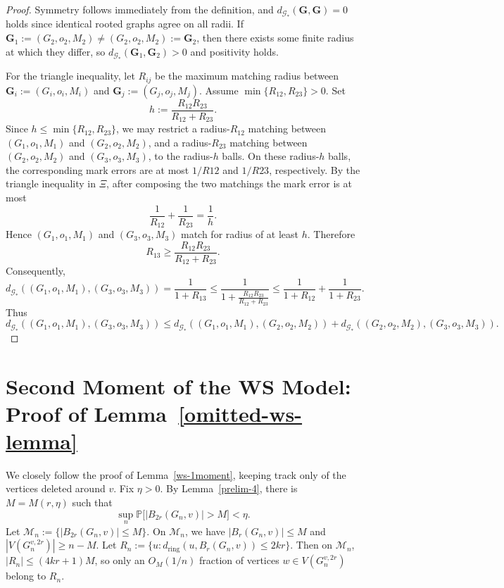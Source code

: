 \documentclass[10pt]{amsart}
\begin{document}
\begin{proof}
Symmetry follows immediately from the definition, and
$d_{\mathscr G_*}(\mathbf G, \mathbf G)=0$ holds since identical rooted graphs agree on all radii.
If $\mathbf G_1 := (G_2,o_2,M_2) \neq (G_2,o_2,M_2) := \mathbf G_2$, then there exists some finite radius at
which they differ, so $d_{\mathscr G_*}(\mathbf G_1, \mathbf G_2) >0$ and positivity holds.

For the triangle inequality, let $R_{ij}$ be the maximum matching radius between
$\mathbf G_i := (G_i,o_i,M_i)$ and $\mathbf G_j := (G_j,o_j,M_j)$. Assume $\min\{R_{12}, R_{23}\} > 0$. Set
\[
h:=\frac{R_{12} R_{23}}{R_{12}+R_{23}}.
\]
Since $h\le \min\{R_{12}, R_{23}\}$, we may restrict a radius-$R_{12}$ matching between
$(G_1,o_1,M_1)$ and $(G_2,o_2,M_2)$, and a radius-$R_{23}$ matching
between $(G_2,o_2,M_2)$ and $(G_3,o_3,M_3)$, to the radius-$h$ balls.
On these radius-$h$ balls, the corresponding mark errors are at most $1/R12$ and $1/R23$, respectively. By the triangle inequality in $\Xi$, after composing
the two matchings the mark error is at most
\[
\frac{1}{R_{12}}+\frac{1}{R_{23}}=\frac{1}{h}.
\]
Hence $(G_1,o_1,M_1)$ and $(G_3,o_3,M_3)$ match for radius of at least $h$.
Therefore
\[
R_{13}\ge \frac{R_{12}R_{23}}{R_{12}+R_{23}}.
\]
Consequently,
\[
d_{\mathscr G_*}((G_1,o_1,M_1),(G_3,o_3,M_3))
= \frac{1}{1+R_{13}}
\le \frac{1}{1+\frac{R_{12}R_{23}}{R_{12}+R_{23}}}
\le \frac{1}{1+R_{12}}+\frac{1}{1+R_{23}}.
\]
Thus
\[
d_{\mathscr G_*}((G_1,o_1,M_1),(G_3,o_3,M_3))
\le
d_{\mathscr G_*}((G_1,o_1,M_1),(G_2,o_2,M_2))
+
d_{\mathscr G_*}((G_2,o_2,M_2),(G_3,o_3,M_3)).
\]
\end{proof}

\section{Second Moment of the WS Model: Proof of Lemma~\ref{omitted-ws-lemma}} \label{sec:omitted-ws-proof}

We closely follow the proof of Lemma~\ref{ws-1moment}, keeping track only of
the vertices deleted around \(v\). Fix \(\eta>0\). By Lemma~\ref{prelim-4},
there is \(M=M(r,\eta)\) such that
\[
    \sup_n \mathbb P\bigl[|B_{2r}(G_n,v)|>M\bigr]<\eta .
\]
Let \(\mathcal M_n:=\{|B_{2r}(G_n,v)|\le M\}\). On \(\mathcal M_n\), we have
\(|B_r(G_n,v)|\le M\) and \(|V(G_n^{v,2r})|\ge n-M\). Let
\(R_n:=\{u:d_{\mathrm{ring}}(u,B_r(G_n,v))\le 2kr\}\). Then on
\(\mathcal M_n\), \(|R_n|\le (4kr+1)M\), so only an \(O_M(1/n)\) fraction of
vertices \(w\in V(G_n^{v,2r})\) belong to \(R_n\). 
\end{document}
